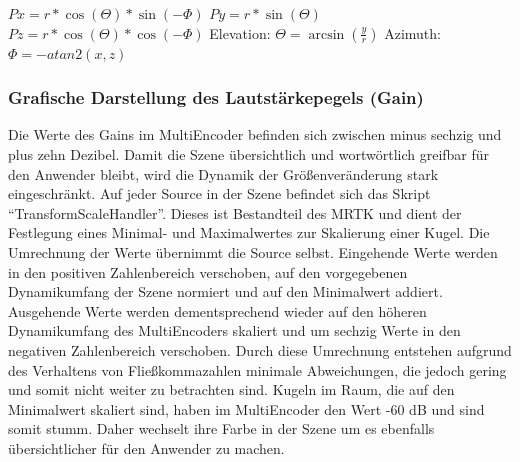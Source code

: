 \documentclass[11pt, titlepage, fleqn]{report}
\begin{document}
                    \large 
                    $Px=r*\cos(\Theta)*\sin(-\Phi)$ \newline
                    $Py=r*\sin(\Theta)$ \newline
                    $Pz=r*\cos(\Theta)*\cos(-\Phi)$ \newline\newline
                    \normalsize Elevation:
                    \large $\Theta = \arcsin(\frac{y}{r})$\newline
                    \normalsize Azimuth: 
                    \large $\Phi =-atan2(x,z)$\normalsize\newline
                    \newline\newline\newline
                    
                    \newpage
                \subsubsection{Grafische Darstellung des Lautstärkepegels (Gain)}
                    Die Werte des Gains im MultiEncoder befinden sich zwischen minus sechzig und plus zehn Dezibel. Damit die Szene 
                    übersichtlich und wortwörtlich greifbar für den Anwender bleibt, wird die Dynamik der Größenveränderung stark eingeschränkt. 
                    Auf jeder Source in der Szene befindet sich das Skript “TransformScaleHandler”. Dieses ist Bestandteil des MRTK und dient 
                    der Festlegung eines Minimal- und Maximalwertes zur Skalierung einer Kugel. 
                    Die Umrechnung der Werte übernimmt die Source selbst. Eingehende Werte werden in den positiven Zahlenbereich verschoben, 
                    auf den vorgegebenen Dynamikumfang der Szene normiert und auf den Minimalwert addiert. Ausgehende Werte werden dementsprechend 
                    wieder auf den höheren Dynamikumfang des MultiEncoders skaliert und um sechzig Werte in den negativen Zahlenbereich verschoben. 
                    Durch diese Umrechnung entstehen aufgrund des Verhaltens von Fließkommazahlen minimale Abweichungen, die jedoch gering und 
                    somit nicht weiter zu betrachten sind.\newline
                    Kugeln im Raum, die auf den Minimalwert skaliert sind, haben im MultiEncoder den Wert -60 dB und sind somit stumm. 
                    Daher wechselt ihre Farbe in der Szene um es ebenfalls übersichtlicher für den Anwender zu machen.
\end{document}

